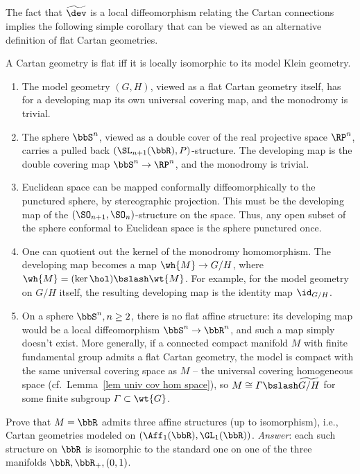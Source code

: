 The fact that $\widetilde{\dev}$ is a local diffeomorphism relating the Cartan connections implies the following simple corollary that can be viewed as an alternative definition of flat Cartan geometries.

\begin{cor}
    A Cartan geometry is flat iff it is locally isomorphic to its model Klein geometry.
\end{cor}

\begin{example}
    \begin{enumerate}
        \item The model geometry $(G,H)$, viewed as a flat Cartan geometry itself, has for a developing map its own universal covering map, and the monodromy is trivial.
        \item The sphere $\bbS^n$, viewed as a double cover of the real projective space $\RP^n$, carries a pulled back $(\SL_{n+1}(\bbR),P)$-structure. The developing map is the double covering map $\bbS^n\to \RP^n$, and the monodromy is trivial.
        \item Euclidean space can be mapped conformally diffeomorphically to the punctured sphere, by stereographic projection. This must be the developing map of the $(\SO_{n+1},\SO_n)$-structure on the space. Thus, any open subset of the sphere conformal to Euclidean space is the sphere punctured once.
        \item One can quotient out the kernel of the monodromy homomorphism. The developing map becomes a map $\wh{M}\to G\slash H$, where $\wh{M}=(\ker\hol)\bslash \wt{M}$. For example, for the model geometry on $G\slash H$ itself, the resulting developing map is the identity map $\id_{G\slash H}$.
        \item On a sphere $\bbS^n,n\geq 2$, there is no flat affine structure: its developing map would be a local diffeomorphism $\bbS^n\to \bbR^n$, and such a map simply doesn't exist. More generally, if a connected compact manifold $M$ with finite fundamental group admits a flat Cartan geometry, the model is compact with the same universal covering space as $M$ -- the  universal covering homogeneous space (cf.\ Lemma~\ref{lem univ cov hom space}), so $M\cong \varGamma\bslash \widetilde{G\slash H}$ for some finite subgroup $\varGamma\subset \wt{G}$.
    \end{enumerate}
\end{example}

\begin{xca}
    Prove that $M=\bbR$ admits three affine structures (up to isomorphism), i.e., Cartan geometries modeled on $(\Aff_1(\bbR),\GL_1(\bbR))$. \emph{Answer}: each such structure on $\bbR$ is isomorphic to the standard one on one of the three manifolds $\bbR,\bbR_+,(0,1)$.
\end{xca}

